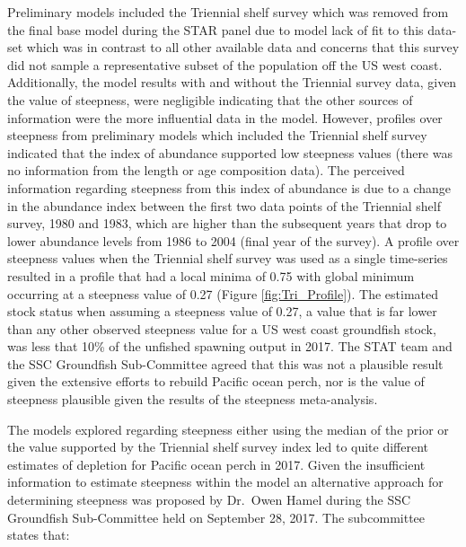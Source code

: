 \documentclass[12pt,]{article}
\begin{document}
Preliminary models included the Triennial shelf survey which was removed
from the final base model during the STAR panel due to model lack of fit
to this data-set which was in contrast to all other available data and
concerns that this survey did not sample a representative subset of the
population off the US west coast. Additionally, the model results with
and without the Triennial survey data, given the value of steepness,
were negligible indicating that the other sources of information were
the more influential data in the model. However, profiles over steepness
from preliminary models which included the Triennial shelf survey
indicated that the index of abundance supported low steepness values
(there was no information from the length or age composition data). The
perceived information regarding steepness from this index of abundance
is due to a change in the abundance index between the first two data
points of the Triennial shelf survey, 1980 and 1983, which are higher
than the subsequent years that drop to lower abundance levels from 1986
to 2004 (final year of the survey). A profile over steepness values when
the Triennial shelf survey was used as a single time-series resulted in
a profile that had a local minima of 0.75 with global minimum occurring
at a steepness value of 0.27 (Figure \ref{fig:Tri_Profile}). The
estimated stock status when assuming a steepness value of 0.27, a value
that is far lower than any other observed steepness value for a US west
coast groundfish stock, was less that 10\% of the unfished spawning
output in 2017. The STAT team and the SSC Groundfish Sub-Committee
agreed that this was not a plausible result given the extensive efforts
to rebuild Pacific ocean perch, nor is the value of steepness plausible
given the results of the steepness meta-analysis.

The models explored regarding steepness either using the median of the
prior or the value supported by the Triennial shelf survey index led to
quite different estimates of depletion for Pacific ocean perch in 2017.
Given the insufficient information to estimate steepness within the
model an alternative approach for determining steepness was proposed by
Dr.~Owen Hamel during the SSC Groundfish Sub-Committee held on September
28, 2017. The subcommittee states that:
\end{document}
